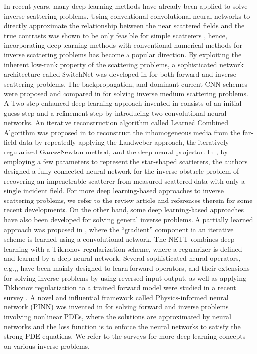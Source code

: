 \documentclass{article}
\begin{document}
	In recent years, many deep learning methods have already been applied to solve inverse scattering problems. Using conventional convolutional neural networks to directly approximate the relationship between the near scattered fields and the true contrasts was shown to be only feasible for simple scatterers \cite{wei2018deep}, hence, incorporating deep learning methods with conventional numerical methods for inverse scattering problems has become a popular direction. By exploiting the inherent low-rank property of the scattering problems, a sophisticated network architecture called SwitchNet was developed in \cite{khoo2019switchnet} for both forward and inverse scattering problems. The backpropagation, and dominant current CNN schemes were proposed and compared in \cite{wei2018deep} for solving inverse medium scattering problems. A Two-step enhanced deep learning approach invented in \cite{yao2019two} consists of an initial guess step and a refinement step by introducing two convolutional neural networks. An iterative reconstruction algorithm called Learned Combined Algorithm was proposed in \cite{li2022reconstruction} to reconstruct the inhomogeneous media from the far-field data by repeatedly applying the Landweber approach, the iteratively regularized Gauss-Newton method, and the deep neural projector. In \cite{gao2022artificial}, by employing a few parameters to represent the star-shaped scatterers, the authors designed a fully connected neural network for the inverse obstacle problem of recovering an impenetrable scatterer from measured scattered data with only a single incident field. For more deep learning-based approaches to inverse scattering problems, we refer to the review article \cite{chen2020review} and references therein for some recent developments. On the other hand, some deep learning-based approaches have also been developed for solving general inverse problems. A partially learned approach was proposed in \cite{adler2017solving}, where the “gradient” component in an iterative scheme is learned using a convolutional network. The NETT \cite{li2020nett} combines deep learning with a Tikhonov regularization scheme, where a regularizer is defined and learned by a deep neural network. Several sophisticated neural operators, e.g.,\cite{lu2021learning,li2020fourier,tripura2022wavelet}, have been mainly designed to learn forward operators, and their extensions for solving inverse problems by using reversed input-output, as well as applying Tikhonov regularization to a trained forward model were studied in a recent survey \cite{tanyu2022deep}. A novel and influential framework called Physics-informed neural network (PINN) was invented in \cite{raissi2019physics} for solving forward and inverse problems involving nonlinear PDEs, where the solutions are approximated by neural networks and the loss function is to enforce the neural networks to satisfy the strong PDE equations.  
We refer to the surveys \cite{arridge2019solving,mccann2017convolutional} for more deep learning concepts on various inverse problems. 
	
\end{document}
